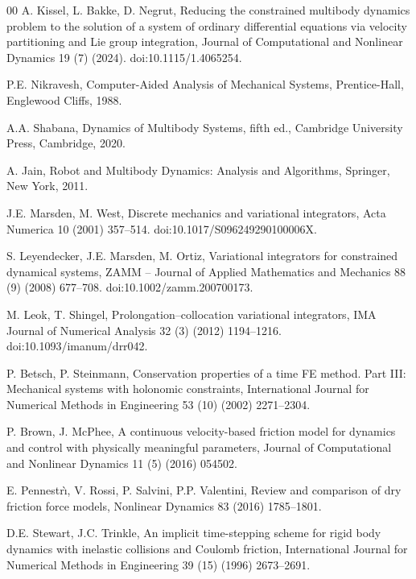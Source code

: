 \documentclass[preprint,12pt]{elsarticle}
\begin{document}
\begin{thebibliography}{00}
A. Kissel, L. Bakke, D. Negrut,
Reducing the constrained multibody dynamics problem to the solution of a system of ordinary
differential equations via velocity partitioning and Lie group integration,
Journal of Computational and Nonlinear Dynamics 19 (7) (2024).
doi:10.1115/1.4065254.

P.E. Nikravesh,
Computer-Aided Analysis of Mechanical Systems, Prentice-Hall, Englewood Cliffs, 1988.

A.A. Shabana,
Dynamics of Multibody Systems, fifth ed., Cambridge University Press, Cambridge, 2020.

A. Jain,
Robot and Multibody Dynamics: Analysis and Algorithms, Springer, New York, 2011.

J.E. Marsden, M. West,
Discrete mechanics and variational integrators,
Acta Numerica 10 (2001) 357--514.
doi:10.1017/S096249290100006X.

S. Leyendecker, J.E. Marsden, M. Ortiz,
Variational integrators for constrained dynamical systems,
ZAMM -- Journal of Applied Mathematics and Mechanics 88 (9) (2008) 677--708.
doi:10.1002/zamm.200700173.

M. Leok, T. Shingel,
Prolongation--collocation variational integrators,
IMA Journal of Numerical Analysis 32 (3) (2012) 1194--1216.
doi:10.1093/imanum/drr042.

P. Betsch, P. Steinmann,
Conservation properties of a time FE method. Part III: Mechanical systems with holonomic
constraints,
International Journal for Numerical Methods in Engineering 53 (10) (2002) 2271--2304.

P. Brown, J. McPhee,
A continuous velocity-based friction model for dynamics and control with physically meaningful
parameters,
Journal of Computational and Nonlinear Dynamics 11 (5) (2016) 054502.

E. Pennestr\`{\i}, V. Rossi, P. Salvini, P.P. Valentini,
Review and comparison of dry friction force models,
Nonlinear Dynamics 83 (2016) 1785--1801.

D.E. Stewart, J.C. Trinkle,
An implicit time-stepping scheme for rigid body dynamics with inelastic collisions and Coulomb
friction,
International Journal for Numerical Methods in Engineering 39 (15) (1996) 2673--2691.


\end{thebibliography}
\end{document}
